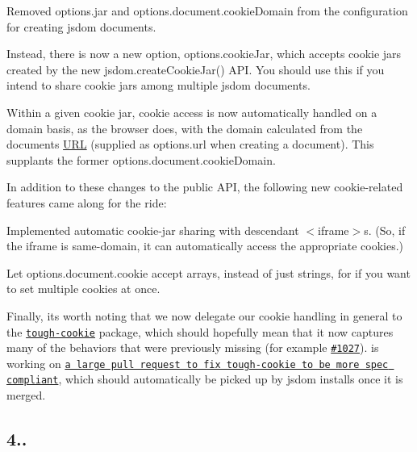 \begin{DoxyItemize}
\item Removed {\ttfamily options.\+jar} and {\ttfamily options.\+document.\+cookie\+Domain} from the configuration for creating jsdom documents.
\item Instead, there is now a new option, {\ttfamily options.\+cookie\+Jar}, which accepts cookie jars created by the new {\ttfamily jsdom.\+create\+Cookie\+Jar()} A\+PI. You should use this if you intend to share cookie jars among multiple jsdom documents.
\item Within a given cookie jar, cookie access is now automatically handled on a domain basis, as the browser does, with the domain calculated from the document\textquotesingle{}s \mbox{\hyperlink{namespace_u_r_l}{U\+RL}} (supplied as {\ttfamily options.\+url} when creating a document). This supplants the former {\ttfamily options.\+document.\+cookie\+Domain}.
\end{DoxyItemize}

In addition to these changes to the public A\+PI, the following new cookie-\/related features came along for the ride\+:


\begin{DoxyItemize}
\item Implemented automatic cookie-\/jar sharing with descendant {\ttfamily $<$iframe$>$}s. (So, if the iframe is same-\/domain, it can automatically access the appropriate cookies.)
\item Let {\ttfamily options.\+document.\+cookie} accept arrays, instead of just strings, for if you want to set multiple cookies at once.
\end{DoxyItemize}

Finally, it\textquotesingle{}s worth noting that we now delegate our cookie handling in general to the \href{https://www.npmjs.com/package/tough-cookie}{\tt tough-\/cookie} package, which should hopefully mean that it now captures many of the behaviors that were previously missing (for example \href{https://github.com/tmpvar/jsdom/issues/1027}{\tt \#1027}).  is working on \href{https://github.com/goinstant/tough-cookie/pull/30}{\tt a large pull request to fix tough-\/cookie to be more spec compliant}, which should automatically be picked up by jsdom installs once it is merged.

\subsection*{4..}


